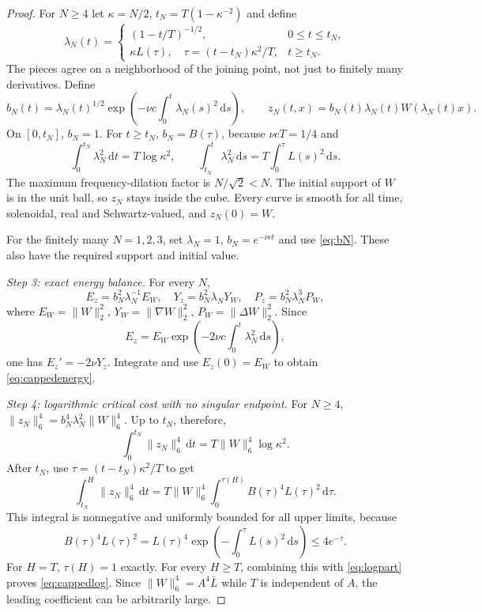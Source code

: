 \documentclass[11pt,a4paper]{article}
\theoremstyle{definition}\newtheorem{definition}[theorem]{Definition}
\theoremstyle{remark}\newtheorem{remark}[theorem]{Remark}
\newcommand{\dd}{\,\mathrm d}
\newcommand{\norm}[1]{\lVert #1\rVert}
\numberwithin{equation}{section}
\begin{document}
\begin{proof}
For $N\ge4$ let $\kappa=N/2$, $t_N=T(1-\kappa^{-2})$ and define
\begin{equation}\label{eq:lambdaN}
 \lambda_N(t)=
 \begin{cases}
 (1-t/T)^{-1/2},&0\le t\le t_N,\\
 \kappa L(\tau),\quad \tau=(t-t_N)\kappa^2/T,&t\ge t_N.
 \end{cases}
\end{equation}
The pieces agree on a neighborhood of the joining point, not just to finitely many derivatives. Define
\begin{equation}\label{eq:bN}
 b_N(t)=\lambda_N(t)^{1/2}
   \exp\!\left(-\nu c\int_0^t\lambda_N(s)^2\dd s\right),
 \qquad z_N(t,x)=b_N(t)\lambda_N(t)W(\lambda_N(t)x).
\end{equation}
On $[0,t_N]$, $b_N=1$. For $t\ge t_N$, $b_N=B(\tau)$, because $\nu cT=1/4$ and
\[
 \int_0^{t_N}\lambda_N^2\dd t=T\log\kappa^2,
 \qquad \int_{t_N}^{t}\lambda_N^2\dd s=T\int_0^\tau L(s)^2\dd s.
\]
The maximum frequency-dilation factor is $N/\sqrt2<N$. The initial support of $W$ is in the unit ball, so $z_N$ stays inside the cube. Every curve is smooth for all time, solenoidal, real and Schwartz-valued, and $z_N(0)=W$.

For the finitely many $N=1,2,3$, set $\lambda_N=1$, $b_N=e^{-\nu ct}$ and use \eqref{eq:bN}. These also have the required support and initial value.

\emph{Step 3: exact energy balance.}
For every $N$,
\[
 E_z=b_N^2\lambda_N^{-1}E_W,
 \quad Y_z=b_N^2\lambda_N Y_W,
 \quad P_z=b_N^2\lambda_N^3P_W,
\]
where $E_W=\norm W_2^2$, $Y_W=\norm{\nabla W}_2^2$, $P_W=\norm{\Delta W}_2^2$. Since
\[
 E_z=E_W\exp\!\left(-2\nu c\int_0^t\lambda_N^2\dd s\right),
\]
one has $E_z'=-2\nu Y_z$. Integrate and use $E_z(0)=E_W$ to obtain \eqref{eq:cappedenergy}.

\emph{Step 4: logarithmic critical cost with no singular endpoint.}
For $N\ge4$, $\norm{z_N}_6^4=b_N^4\lambda_N^2\norm W_6^4$. Up to $t_N$, therefore,
\begin{equation}\label{eq:logpart}
 \int_0^{t_N}\norm{z_N}_6^4\dd t
 =T\norm W_6^4\log\kappa^2.
\end{equation}
After $t_N$, use $\tau=(t-t_N)\kappa^2/T$ to get
\[
 \int_{t_N}^H\norm{z_N}_6^4\dd t
 =T\norm W_6^4\int_0^{\tau(H)}B(\tau)^4L(\tau)^2\dd\tau.
\]
This integral is nonnegative and uniformly bounded for all upper limits, because
\[
 B(\tau)^4L(\tau)^2
 =L(\tau)^4\exp\!\left(-\int_0^\tau L(s)^2\dd s\right)
 \le4e^{-\tau}.
\]
For $H=T$, $\tau(H)=1$ exactly. For every $H\ge T$, combining this with \eqref{eq:logpart} proves \eqref{eq:cappedlog}. Since $\norm W_6^4=A^4\overline L$ while $T$ is independent of $A$, the leading coefficient can be arbitrarily large.


\end{proof}
\end{document}
